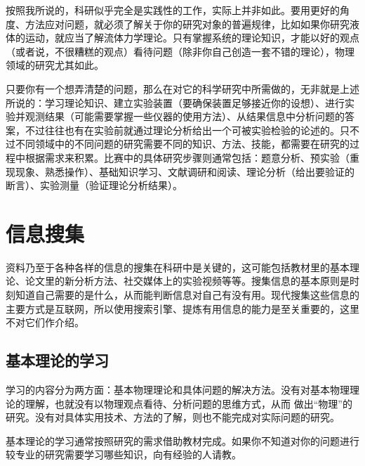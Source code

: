 \documentclass[a4paper,10pt,english]{sphinxmanual}
\begin{document}
按照我所说的，科研似乎完全是实践性的工作，实际上并非如此。要用更好的角度、方法应对问题，就必须了解关于你的研究对象的普遍规律，比如如果你研究液体的运动，就应当了解流体力学理论。只有掌握系统的理论知识，才能以好的观点（或者说，不很糟糕的观点）看待问题（除非你自己创造一套不错的理论），物理领域的研究尤其如此。

只要你有一个想弄清楚的问题，那么在对它的科学研究中所需做的，无非就是上述所说的：学习理论知识、建立实验装置（要确保装置足够接近你的设想）、进行实验并观测结果（可能需要掌握一些仪器的使用方法）、从结果信息中分析问题的答案，不过往往也有在实验前就通过理论分析给出一个可被实验检验的论述的。只不过不同领域中的不同问题的研究需要不同的知识、方法、技能，都需要在研究的过程中根据需求来积累。比赛中的具体研究步骤则通常包括：题意分析、预实验（重现现象、熟悉操作）、基础知识学习、文献调研和阅读、理论分析（给出要验证的断言）、实验测量（验证理论分析结果）。


\chapter{信息搜集}
\label{\detokenize{4. GetInfo::doc}}\label{\detokenize{4. GetInfo:id1}}
资料乃至于各种各样的信息的搜集在科研中是关键的，这可能包括教材里的基本理论、论文里的新分析方法、社交媒体上的实验视频等等。搜集信息的基本原则是时刻知道自己需要的是什么，从而能判断信息对自己有没有用。现代搜集这些信息的主要方式是互联网，所以使用搜索引擎、提炼有用信息的能力是至关重要的，这里不对它们作介绍。


\section{基本理论的学习}
\label{\detokenize{4. GetInfo:id2}}
学习的内容分为两方面：基本物理理论和具体问题的解决方法。没有对基本物理理论的理解，也就没有以物理观点看待、分析问题的思维方式，从而  做出“物理”的研究。没有对具体实用技术、方法的了解，则也不能完成对实际问题的研究。

基本理论的学习通常按照研究的需求借助教材完成。如果你不知道对你的问题进行较专业的研究需要学习哪些知识，向有经验的人请教。
\end{document}
